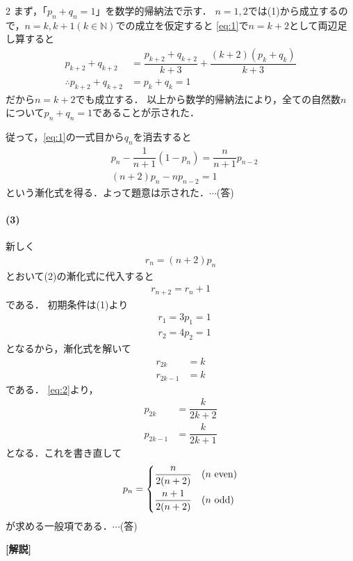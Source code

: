 \documentclass[../../main.tex]{subfiles}
\begin{document}
\begin{multicols}{2}
  まず，「$p_n+q_n=1$」を数学的帰納法で示す．
  $n=1,2$では(1)から成立するので，$n=k, k+1 (k \in \mathbb{N})$での成立を仮定すると
  \cref{eq:1}で$n=k+2$として両辺足し算すると
  \begin{align}
    p_{k+2} + q_{k+2}
    & = \dfrac{p_{k+2}+q_{k+2}}{k+3} + \dfrac{(k+2)(p_{k}+q_{k})}{k+3} \\
    \therefore
    p_{k+2} + q_{k+2}
    & = p_{k}+q_{k} = 1
  \end{align}
  だから$n=k+2$でも成立する．
  以上から数学的帰納法により，全ての自然数$n$について$p_n+q_n=1$であることが示された．

  従って，\cref{eq:1}の一式目から$q_n$を消去すると
  \begin{align}
    & p_n - \dfrac{1}{n+1}(1-p_n) = \dfrac{n}{n+1}p_{n-2} \\
    & (n+2)p_n - n p_{n-2} = 1
  \end{align}
  という漸化式を得る．よって題意は示された．$\cdots$(答)

  \paragraph{(3)}
  新しく
  \begin{align}
    r_n = (n+2)p_n  \label{eq:2}
  \end{align}
  とおいて(2)の漸化式に代入すると
  \begin{align}
    r_{n+2} = r_{n}+1
  \end{align}
  である．
  初期条件は(1)より
  \begin{align}
    & r_1 = 3 p_1 = 1 \\
    & r_2 = 4 p_2 = 1
  \end{align}
  となるから，漸化式を解いて
  \begin{align}
    r_{2k}   & = k \\
    r_{2k-1} & = k
  \end{align}
  である．
  \cref{eq:2}より，
  \begin{align}
    p_{2k}   & = \dfrac{k}{2k+2} \\
    p_{2k-1} & = \dfrac{k}{2k+1}
  \end{align}
  となる．これを書き直して
  \begin{align}
    p_n =
    \begin{dcases}
      \dfrac{n}{2(n+2)}   & (n \text{ even}) \\
      \dfrac{n+1}{2(n+2)} & (n \text{ odd})
    \end{dcases}
  \end{align}
  が求める一般項である．$\cdots$(答)

  {\bf [解説]}

  \newpage
\end{multicols}
\end{document}
